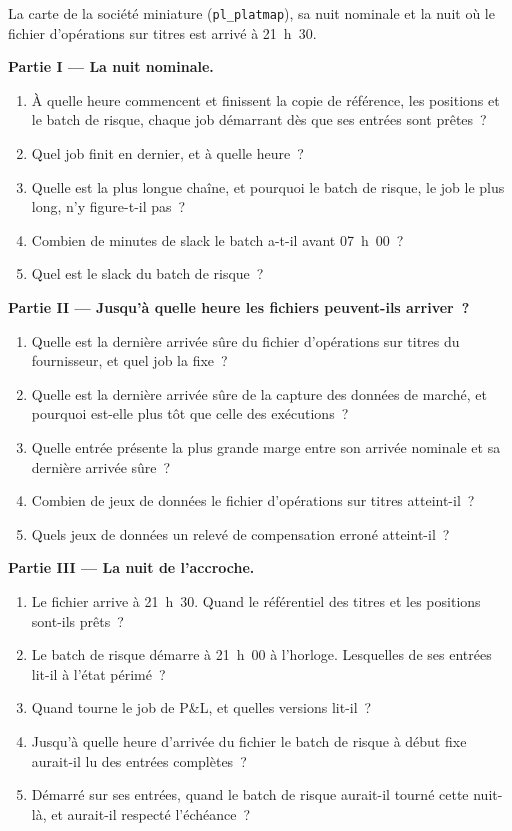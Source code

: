 \begin{problem}\label{pb:pl:the-platform-map:1}
La carte de la société miniature (\texttt{pl\_platmap}), sa nuit nominale et la nuit où le fichier d'opérations sur titres est arrivé à 21~h~30.

\medskip\noindent\textbf{Partie I --- La nuit nominale.}
\begin{enumerate}
\item À quelle heure commencent et finissent la copie de référence, les positions et le batch de risque, chaque job démarrant dès que ses entrées sont prêtes~?
\item Quel job finit en dernier, et à quelle heure~?
\item Quelle est la plus longue chaîne, et pourquoi le batch de risque, le job le plus long, n'y figure-t-il pas~?
\item Combien de minutes de slack le batch a-t-il avant 07~h~00~?
\item Quel est le slack du batch de risque~?
\end{enumerate}

\medskip\noindent\textbf{Partie II --- Jusqu'à quelle heure les fichiers peuvent-ils arriver~?}
\begin{enumerate}[resume]
\item Quelle est la dernière arrivée sûre du fichier d'opérations sur titres du fournisseur, et quel job la fixe~?
\item Quelle est la dernière arrivée sûre de la capture des données de marché, et pourquoi est-elle plus tôt que celle des exécutions~?
\item Quelle entrée présente la plus grande marge entre son arrivée nominale et sa dernière arrivée sûre~?
\item Combien de jeux de données le fichier d'opérations sur titres atteint-il~?
\item Quels jeux de données un relevé de compensation erroné atteint-il~?
\end{enumerate}

\medskip\noindent\textbf{Partie III --- La nuit de l'accroche.}
\begin{enumerate}[resume]
\item Le fichier arrive à 21~h~30. Quand le référentiel des titres et les positions sont-ils prêts~?
\item Le batch de risque démarre à 21~h~00 à l'horloge. Lesquelles de ses entrées lit-il à l'état périmé~?
\item Quand tourne le job de P\&L, et quelles versions lit-il~?
\item Jusqu'à quelle heure d'arrivée du fichier le batch de risque à début fixe aurait-il lu des entrées complètes~?
\item Démarré sur ses entrées, quand le batch de risque aurait-il tourné cette nuit-là, et aurait-il respecté l'échéance~?
\end{enumerate}


\end{problem}
